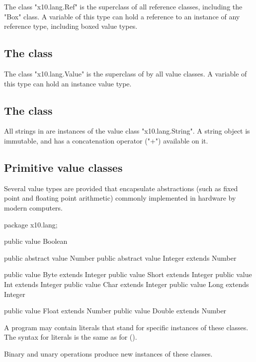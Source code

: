 The class \xcd"x10.lang.Ref" is the superclass of all reference
classes, including the \xcd"Box" class.
A variable of this type can hold a reference to an instance of any
reference type, including boxed value types.

\subsection{The class }
\label{Value}

The class \xcd"x10.lang.Value" is the superclass of by all value
classes.
A variable of this type can hold an instance value type.

\subsection{The class }
\label{String}

All strings in \Xten{} are instances of the value class
\xcd"x10.lang.String".
A string object is immutable,
and has a concatenation operator (\xcd"+") available on it.

\subsection{Primitive value classes}

Several value types are provided that encapsulate
abstractions (such as fixed point and floating point arithmetic)
commonly implemented in hardware by modern computers.

\begin{xten}
package x10.lang;

public value Boolean { }

public abstract value Number { }
public abstract value Integer extends Number { }

public value Byte extends Integer  { }
public value Short extends Integer { }
public value Int extends Integer   { }
public value Char extends Integer  { }
public value Long extends Integer  { }

public value Float extends Number  { }
public value Double extends Number { }
\end{xten}

A program may contain literals
that stand for specific instances of these classes. The syntax
for literals is the same as for \java{} ().

Binary and unary operations produce new instances of these
classes.

